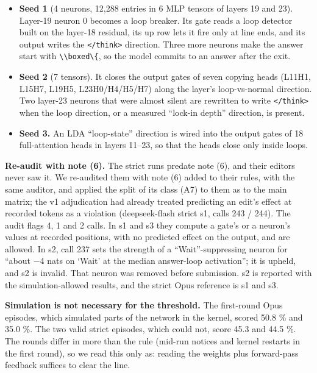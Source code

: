 \documentclass[
  10pt,
]{article}
\newcommand{\passthrough}[1]{#1}
\providecommand{\tightlist}{%
  \setlength{\itemsep}{0pt}\setlength{\parskip}{0pt}}
\begin{document}
\begin{itemize}
\tightlist
\item
  \textbf{Seed 1} (4 neurons, 12,288 entries in 6 MLP tensors of layers
  19 and 23). Layer-19 neuron 0 becomes a loop breaker. Its gate reads a
  loop detector built on the layer-18 residual, its up row lets it fire
  only at line ends, and its output writes the
  \passthrough{\lstinline!</think>!} direction. Three more neurons make
  the answer start with \passthrough{\lstinline!\\boxed\{!}, so the
  model commits to an answer after the exit.
\item
  \textbf{Seed 2} (7 tensors). It closes the output gates of seven
  copying heads (L11H1, L15H7, L19H5, L23H0/H4/H5/H7) along the layer's
  loop-vs-normal direction. Two layer-23 neurons that were almost silent
  are rewritten to write \passthrough{\lstinline!</think>!} when the
  loop direction, or a measured ``lock-in depth'' direction, is present.
\item
  \textbf{Seed 3.} An LDA ``loop-state'' direction is wired into the
  output gates of 18 full-attention heads in layers 11--23, so that the
  heads close only inside loops.
\end{itemize}

\textbf{Re-audit with note (6).} The strict runs predate note (6), and
their editors never saw it. We re-audited them with note (6) added to
their rules, with the same auditor, and applied the split of its class
(A7) to them as to the main matrix; the v1 adjudication had already
treated predicting an edit's effect at recorded tokens as a violation
(deepseek-flash strict s1, calls 243 / 244). The audit flags 4, 1 and 2
calls. In s1 and s3 they compute a gate's or a neuron's values at
recorded positions, with no predicted effect on the output, and are
allowed. In s2, call 237 sets the strength of a ``Wait''-suppressing
neuron for ``about \ensuremath{-}4 nats on `Wait' at the median answer-loop
activation''; it is upheld, and s2 is invalid. That neuron was removed
before submission. s2 is reported with the simulation-allowed results,
and the strict Opus reference is s1 and s3.

\textbf{Simulation is not necessary for the threshold.} The first-round
Opus episodes, which simulated parts of the network in the kernel,
scored 50.8 \% and 35.0 \%. The two valid strict episodes, which could
not, score 45.3 and 44.5 \%. The rounds differ in more than the rule
(mid-run notices and kernel restarts in the first round), so we read
this only as: reading the weights plus forward-pass feedback suffices to
clear the line.
\end{document}
